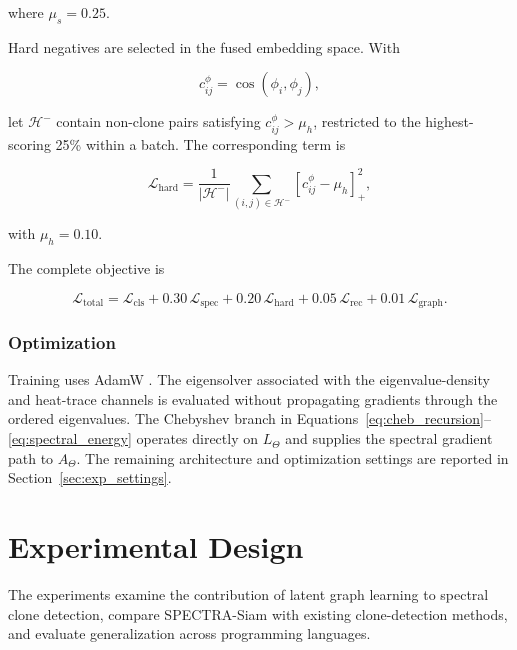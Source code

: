 \documentclass[authoryear,final,5p,times,twocolumn]{elsarticle}
\theoremstyle{plain}
\begin{document}
where $\mu_s=0.25$.

Hard negatives are selected in the fused embedding space. With

\begin{equation}
c_{ij}^{\phi}
=
\cos(\phi_i,\phi_j),
\end{equation}

let $\mathcal{H}^{-}$ contain non-clone pairs satisfying
$c_{ij}^{\phi}>\mu_h$, restricted to the highest-scoring 25\% within a batch.
The corresponding term is

\begin{equation}
\label{eq:hard_negative_loss}
\mathcal{L}_{\mathrm{hard}}
=
\frac{1}{|\mathcal{H}^{-}|}
\sum_{(i,j)\in\mathcal{H}^{-}}
\left[
    c_{ij}^{\phi}-\mu_h
\right]_{+}^{2},
\end{equation}

with $\mu_h=0.10$.

The complete objective is

\begin{equation}
\label{eq:complete_loss}
\boxed{
\mathcal{L}_{\mathrm{total}}
=
\mathcal{L}_{\mathrm{cls}}
+
0.30\,\mathcal{L}_{\mathrm{spec}}
+
0.20\,\mathcal{L}_{\mathrm{hard}}
+
0.05\,\mathcal{L}_{\mathrm{rec}}
+
0.01\,\mathcal{L}_{\mathrm{graph}}
}.
\end{equation}


\subsubsection{Optimization}
\label{sec:training_procedure}

Training uses AdamW \cite{??}. The eigensolver associated with the
eigenvalue-density and heat-trace channels is evaluated without propagating
gradients through the ordered eigenvalues. The Chebyshev branch in
Equations~\ref{eq:cheb_recursion}--\ref{eq:spectral_energy} operates directly
on $L_{\Theta}$ and supplies the spectral gradient path to
$A_{\Theta}$. The remaining architecture and optimization settings are
reported in Section~\ref{sec:exp_settings}.


\section{Experimental Design}
\label{sec:exp_design}

The experiments examine the contribution of latent graph learning to spectral
clone detection, compare SPECTRA-Siam with existing clone-detection methods,
and evaluate generalization across programming languages.
\end{document}
